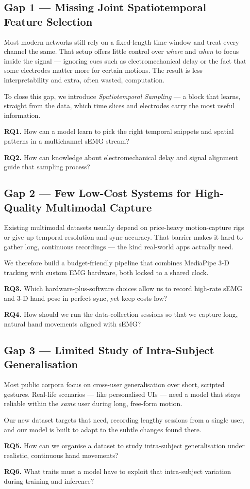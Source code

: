 \subsection*{Gap 1 — Missing Joint Spatiotemporal Feature Selection}

Most modern networks still rely on a fixed-length time window and treat every channel the same. That setup offers little control over \emph{where} and \emph{when} to focus inside the signal — ignoring cues such as electromechanical delay or the fact that some electrodes matter more for certain motions. The result is less interpretability and extra, often wasted, computation.

To close this gap, we introduce \textit{Spatiotemporal Sampling} — a block that learns, straight from the data, which time slices and electrodes carry the most useful information.

\textbf{RQ1.} How can a model learn to pick the right temporal snippets and spatial patterns in a multichannel sEMG stream?  

\textbf{RQ2.} How can knowledge about electromechanical delay and signal alignment guide that sampling process?

\subsection*{Gap 2 — Few Low-Cost Systems for High-Quality Multimodal Capture}

Existing multimodal datasets usually depend on price-heavy motion-capture rigs or give up temporal resolution and sync accuracy. That barrier makes it hard to gather long, continuous recordings — the kind real-world apps actually need.

We therefore build a budget-friendly pipeline that combines MediaPipe 3-D tracking with custom EMG hardware, both locked to a shared clock.

\textbf{RQ3.} Which hardware-plus-software choices allow us to record high-rate sEMG and 3-D hand pose in perfect sync, yet keep costs low?  

\textbf{RQ4.} How should we run the data-collection sessions so that we capture long, natural hand movements aligned with sEMG?

\subsection*{Gap 3 — Limited Study of Intra-Subject Generalisation}

Most public corpora focus on cross-user generalisation over short, scripted gestures. Real-life scenarios — like personalised UIs — need a model that stays reliable within the \emph{same} user during long, free-form motion.

Our new dataset targets that need, recording lengthy sessions from a single user, and our model is built to adapt to the subtle changes found there.

\textbf{RQ5.} How can we organise a dataset to study intra-subject generalisation under realistic, continuous hand movements?  

\textbf{RQ6.} What traits must a model have to exploit that intra-subject variation during training and inference?
